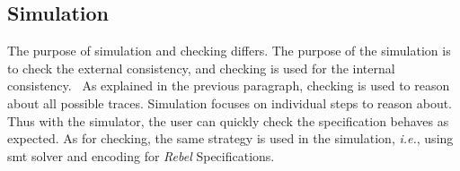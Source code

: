 \subsection{Simulation}
The purpose of simulation and checking differs. The purpose of the simulation is to check the external consistency, and checking is used for the internal consistency.~\cite[p.~5]{stoel_storm_vinju_bosman_2016} As explained in the previous paragraph, checking is used to reason about all possible traces. Simulation focuses on individual steps to reason about. Thus with the simulator, the user can quickly check the specification behaves as expected. As for checking, the same strategy is used in the simulation, \textit{i.e.}, using \gls{smt} solver and encoding for \textit{Rebel} Specifications.
